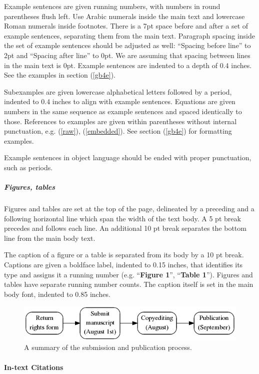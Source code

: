 \documentclass{salt}
\begin{document}
Example sentences are given running numbers, with numbers in round parentheses flush left. Use Arabic numerals inside the main text and lowercase Roman numerals inside footnotes. There is a 7pt space before and after a set of example sentences, separating them from the main text. Paragraph spacing inside the set of example sentences should be adjusted as well: ``Spacing before line'' to 2pt and ``Spacing after line'' to 0pt. We are assuming that spacing between lines in the main text is 0pt. Example sentences are indented to a depth of 0.4 inches. See the examples in section (\ref{gb4e}).

Subexamples are given lowercase alphabetical letters followed by a period, indented to 0.4 inches to align with example sentences. Equations are given numbers in the same sequence as example sentences and spaced identically to those. References to examples are given within parentheses without internal punctuation, e.g. (\ref{raw}), (\ref{embedded}). See section (\ref{gb4e}) for formatting examples.

Example sentences in object language should be ended with proper punctuation, such as periods.

\subparagraph{Figures, tables}

Figures and tables are set at the top of the page, delineated by a preceding and a following horizontal line which span the width of the text body. A 5 pt break precedes and follows each line. An additional 10 pt break separates the bottom line from the main body text.

The caption of a figure or a table is separated from its body by a 10 pt break. Captions are given a boldface label, indented to 0.15 inches, that identifies its type and assigns it a running number (e.g. ``\textbf{Figure 1}'', ``\textbf{Table 1}''). Figures and tables have separate running number counts. The caption itself is set in the main body font, indented to 0.85 inches.

\begin{figure}
\includegraphics[width=5.5in]{figure.png}
\caption{A summary of the submission and publication process.}
\end{figure}

\paragraph{In-text Citations}\label{sec:citations}
\end{document}

